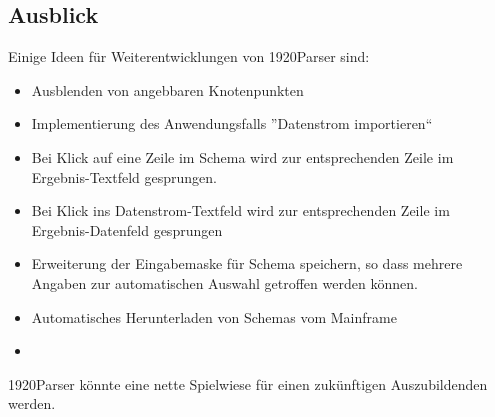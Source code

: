\subsection{Ausblick}
\label{sec:Ausblick}
Einige Ideen für Weiterentwicklungen von 1920Parser sind:
\begin{itemize}
\item Ausblenden von angebbaren Knotenpunkten
\item Implementierung des Anwendungsfalls ''Datenstrom importieren``
\item Bei Klick auf eine Zeile im Schema wird zur entsprechenden Zeile im Ergebnis-Textfeld gesprungen.
\item Bei Klick ins Datenstrom-Textfeld wird zur entsprechenden Zeile im Ergebnis-Datenfeld gesprungen
\item Erweiterung der Eingabemaske für Schema speichern, so dass mehrere Angaben zur automatischen Auswahl getroffen werden können.
\item Automatisches Herunterladen von Schemas vom Mainframe
\item 
\end{itemize}
1920Parser könnte eine nette Spielwiese für einen zukünftigen Auszubildenden werden.
